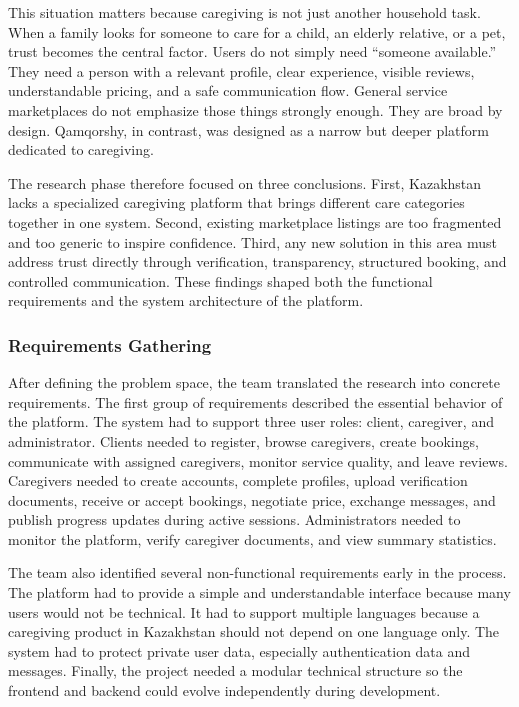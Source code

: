\documentclass[12pt,a4paper]{article}
\begin{document}
This situation matters because caregiving is not just another household task. When a family looks for someone to care for a child, an elderly relative, or a pet, trust becomes the central factor. Users do not simply need ``someone available.'' They need a person with a relevant profile, clear experience, visible reviews, understandable pricing, and a safe communication flow. General service marketplaces do not emphasize those things strongly enough. They are broad by design. Qamqorshy, in contrast, was designed as a narrow but deeper platform dedicated to caregiving.

The research phase therefore focused on three conclusions. First, Kazakhstan lacks a specialized caregiving platform that brings different care categories together in one system. Second, existing marketplace listings are too fragmented and too generic to inspire confidence. Third, any new solution in this area must address trust directly through verification, transparency, structured booking, and controlled communication. These findings shaped both the functional requirements and the system architecture of the platform.

\subsubsection{Requirements Gathering}

After defining the problem space, the team translated the research into concrete requirements. The first group of requirements described the essential behavior of the platform. The system had to support three user roles: client, caregiver, and administrator. Clients needed to register, browse caregivers, create bookings, communicate with assigned caregivers, monitor service quality, and leave reviews. Caregivers needed to create accounts, complete profiles, upload verification documents, receive or accept bookings, negotiate price, exchange messages, and publish progress updates during active sessions. Administrators needed to monitor the platform, verify caregiver documents, and view summary statistics.

The team also identified several non-functional requirements early in the process. The platform had to provide a simple and understandable interface because many users would not be technical. It had to support multiple languages because a caregiving product in Kazakhstan should not depend on one language only. The system had to protect private user data, especially authentication data and messages. Finally, the project needed a modular technical structure so the frontend and backend could evolve independently during development.
\end{document}
